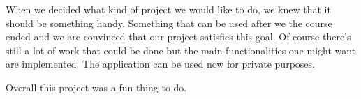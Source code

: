 \documentclass{report}
\begin{document}
When we decided what kind of project we would like to do, we knew that it should be something handy. Something that can be used after we the course ended and we are convinced that our project satisfies this goal. Of course there's still a lot of work that could be done but the main functionalities one might want are implemented. The application can be used now for private purposes.

Overall this project was a fun thing to do. 



\end{document}
